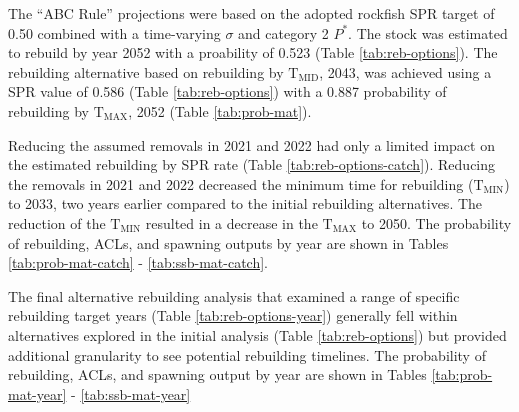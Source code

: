 \documentclass[11pt,
  english,
  a4paper,
]{article}
\begin{document}
\leavevmode\tagmcend\tagstructend\par


The ``ABC Rule'' projections were based on the adopted rockfish SPR target of 0.50 combined with a time-varying {\(\sigma\)\leavevmode\tagmcend\tagstructend} and category 2 {\(P^*\)\leavevmode\tagmcend\tagstructend}. The stock was estimated to rebuild by year 2052 with a proability of 0.523 (Table \ref{tab:reb-options}). The rebuilding alternative based on rebuilding by {\(\text{T}_\text{MID}\)\leavevmode\tagmcend\tagstructend}, 2043, was achieved using a SPR value of 0.586 (Table \ref{tab:reb-options}) with a 0.887 probability of rebuilding by {\(\text{T}_\text{MAX}\)\leavevmode\tagmcend\tagstructend}, 2052 (Table \ref{tab:prob-mat}).

\leavevmode\tagmcend\tagstructend\par


Reducing the assumed removals in 2021 and 2022 had only a limited impact on the estimated rebuilding by SPR rate (Table \ref{tab:reb-options-catch}). Reducing the removals in 2021 and 2022 decreased the minimum time for rebuilding ({\(\text{T}_\text{MIN}\)\leavevmode\tagmcend\tagstructend}) to 2033, two years earlier compared to the initial rebuilding alternatives. The reduction of the {\(\text{T}_\text{MIN}\)\leavevmode\tagmcend\tagstructend} resulted in a decrease in the {\(\text{T}_\text{MAX}\)\leavevmode\tagmcend\tagstructend} to 2050. The probability of rebuilding, ACLs, and spawning outputs by year are shown in Tables \ref{tab:prob-mat-catch} - \ref{tab:ssb-mat-catch}.

\leavevmode\tagmcend\tagstructend\par


The final alternative rebuilding analysis that examined a range of specific rebuilding target years (Table \ref{tab:reb-options-year}) generally fell within alternatives explored in the initial analysis (Table \ref{tab:reb-options}) but provided additional granularity to see potential rebuilding timelines. The probability of rebuilding, ACLs, and spawning output by year are shown in Tables \ref{tab:prob-mat-year} - \ref{tab:ssb-mat-year}
\end{document}
